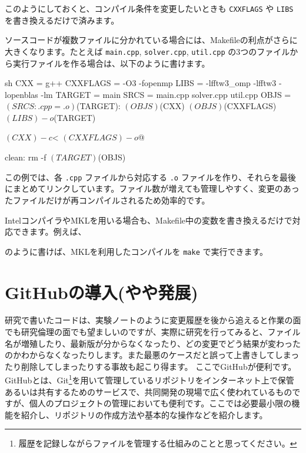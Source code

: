 \documentclass[12pt]{jreport}
\begin{document}
このようにしておくと、コンパイル条件を変更したいときも \texttt{CXXFLAGS} や \texttt{LIBS} を書き換えるだけで済みます。

ソースコードが複数ファイルに分かれている場合には、Makefileの利点がさらに大きくなります。たとえば \texttt{main.cpp}, \texttt{solver.cpp}, \texttt{util.cpp} の3つのファイルから実行ファイルを作る場合は、以下のように書けます。

\begin{codebox}[Makefile]{sh}
CXX = g++
CXXFLAGS = -O3 -fopenmp
LIBS = -lfftw3_omp -lfftw3 -lopenblas -lm
TARGET = main
SRCS = main.cpp solver.cpp util.cpp
OBJS = $(SRCS:.cpp=.o)

$(TARGET): $(OBJS)
	$(CXX) $(OBJS) $(CXXFLAGS) $(LIBS) -o $(TARGET)

	$(CXX) -c $< $(CXXFLAGS) -o $@

clean:
	rm -f $(TARGET) $(OBJS)
\end{codebox}

この例では、各 \texttt{.cpp} ファイルから対応する \texttt{.o} ファイルを作り、それらを最後にまとめてリンクしています。ファイル数が増えても管理しやすく、変更のあったファイルだけが再コンパイルされるため効率的です。

IntelコンパイラやMKLを用いる場合も、Makefile中の変数を書き換えるだけで対応できます。例えば、
のように書けば、MKLを利用したコンパイルを \texttt{make} で実行できます。

\section{GitHubの導入(やや発展)}
研究で書いたコードは、実験ノートのように変更履歴を後から追えると作業の面でも研究倫理の面でも望ましいのですが、実際に研究を行ってみると、ファイル名が増殖したり、最新版が分からなくなったり、どの変更でどう結果が変わったのかわからなくなったりします。また最悪のケースだと誤って上書きしてしまったり削除してしまったりする事故も起こり得ます。
ここでGitHubが便利です。GitHubとは、Git\footnote{履歴を記録しながらファイルを管理する仕組みのことと思ってください。}を用いて管理しているリポジトリをインターネット上で保管あるいは共有するためのサービスで、共同開発の現場で広く使われているものですが、個人のプロジェクトの管理においても便利です。ここでは必要最小限の機能を紹介し、リポジトリの作成方法や基本的な操作などを紹介します。
\end{document}
